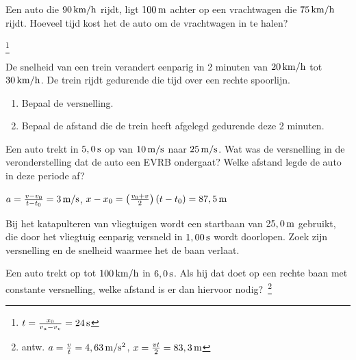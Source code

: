 \documentclass{ximera}
\begin{document}
\begin{exercise} Een auto die $90\rm\,km/h$ rijdt, ligt $100\rm\,m$ achter op een vrachtwagen die $75\rm\,km/h$ rijdt. Hoeveel tijd kost het de auto om de vrachtwagen in te halen? 
\begin{oplossing}
\footnote{$t=\frac{x_0}{v_a-v_v}=24\rm\,s$}
\end{oplossing}

\end{exercise}

\begin{exercise} De snelheid van een trein verandert eenparig in 2 minuten van $20\rm\,km/h$ tot $30\rm\,km/h$. De trein rijdt gedurende die tijd over een rechte spoorlijn.
\begin{enumerate}
    \item Bepaal de versnelling.
    \item Bepaal de afstand die de trein heeft afgelegd gedurende deze 2 minuten.
\end{enumerate}

\end{exercise}

\begin{exercise} Een auto trekt in $5,0\rm\,s$ op van $10\rm\,m/s$ naar $25\rm\,m/s$. Wat was de versnelling in de veronderstelling dat de auto een EVRB ondergaat? Welke afstand legde de auto in deze periode af?
\begin{oplossing}
\newline
$a=\frac{v-v_0}{t-t_0}=3\rm\,m/s$,
$x-x_0=\left(\frac{v_0+v}{2}\right)(t-t_0)=87,5\rm\,m$
\end{oplossing}

\end{exercise}

\begin{exercise} Bij het katapulteren van vliegtuigen wordt een startbaan van
$25,0\rm\,m$ gebruikt, die door het vliegtuig eenparig versneld in
$1,00\rm\,s$ wordt doorlopen. Zoek zijn versnelling en de snelheid
waarmee het de baan verlaat.

\end{exercise}

\begin{exercise} Een auto trekt op tot $100\rm\,km/h$ in $6,0\rm\,s$. Als hij
dat doet op een rechte baan met constante versnelling, welke afstand
is er dan hiervoor nodig?~\footnote{antw.
$a=\frac{v}{t}=4,63\rm\,m/s^2$, $x=\frac{vt}{2}=83,3\rm\,m$}

\end{exercise}
\end{document}
